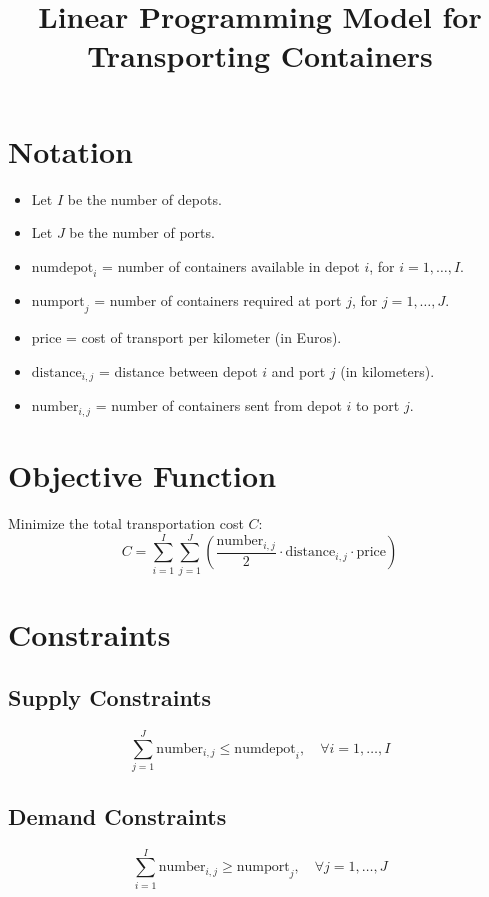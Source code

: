 \documentclass{article}
\begin{document}
\title{Linear Programming Model for Transporting Containers}
\author{}
\date{}
\maketitle

\section*{Notation}
\begin{itemize}
    \item Let \( I \) be the number of depots.
    \item Let \( J \) be the number of ports.
    \item \( \text{numdepot}_i \) = number of containers available in depot \( i \), for \( i = 1, \ldots, I \).
    \item \( \text{numport}_j \) = number of containers required at port \( j \), for \( j = 1, \ldots, J \).
    \item \( \text{price} \) = cost of transport per kilometer (in Euros).
    \item \( \text{distance}_{i,j} \) = distance between depot \( i \) and port \( j \) (in kilometers).
    \item \( \text{number}_{i,j} \) = number of containers sent from depot \( i \) to port \( j \).
\end{itemize}

\section*{Objective Function}
Minimize the total transportation cost \( C \):
\[
C = \sum_{i=1}^{I} \sum_{j=1}^{J} \left( \frac{\text{number}_{i,j}}{2} \cdot \text{distance}_{i,j} \cdot \text{price} \right)
\]

\section*{Constraints}
\subsection*{Supply Constraints}
\[
\sum_{j=1}^{J} \text{number}_{i,j} \leq \text{numdepot}_i, \quad \forall i = 1, \ldots, I
\]

\subsection*{Demand Constraints}
\[
\sum_{i=1}^{I} \text{number}_{i,j} \geq \text{numport}_j, \quad \forall j = 1, \ldots, J
\]
\end{document}
